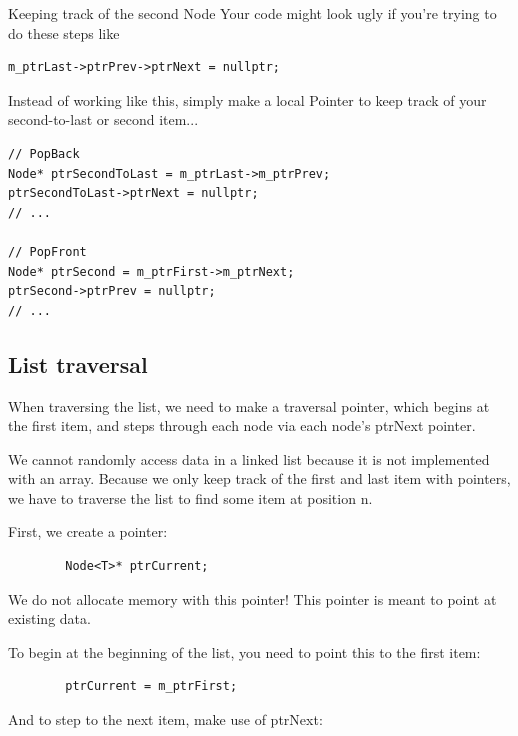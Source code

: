 \documentclass[a4paper,12pt,onepage]{book}
\begin{document}
            \begin{hint}{Keeping track of the second Node}
                Your code might look ugly if you're trying to do these steps like
\begin{verbatim}
m_ptrLast->ptrPrev->ptrNext = nullptr;
\end{verbatim}
                
                Instead of working like this, simply make a local Pointer
                to keep track of your second-to-last or second item...
                
\begin{verbatim}
// PopBack
Node* ptrSecondToLast = m_ptrLast->m_ptrPrev;
ptrSecondToLast->ptrNext = nullptr;
// ...

// PopFront
Node* ptrSecond = m_ptrFirst->m_ptrNext;
ptrSecond->ptrPrev = nullptr;
// ...
\end{verbatim}                
            \end{hint}
    
    \subsection*{List traversal}

        When traversing the list, we need to make a traversal pointer, 
        which begins at the first item, and steps through each node via 
        each node's ptrNext pointer.

        We cannot randomly access data in a linked list because it is not 
        implemented with an array. Because we only keep track of the first 
        and last item with pointers, we have to traverse the list to find some 
        item at position n.

        First, we create a pointer:

    \begin{verbatim} 
        Node<T>* ptrCurrent;
    \end{verbatim} 

        We do not allocate memory with this pointer! This pointer is meant to point at existing data.

        To begin at the beginning of the list, you need to point this to the first item:

    \begin{verbatim} 
        ptrCurrent = m_ptrFirst;
    \end{verbatim} 

        And to step to the next item, make use of ptrNext:
\end{document}
